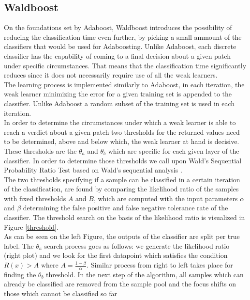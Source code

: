 \documentclass[11pt]{article}
\begin{document}
\subsection{Waldboost}
On the foundations set by Adaboost, Waldboost \cite{Matas05waldboost-} introduces the possibility of reducing the classification time even further, by picking a small ammount of the classifiers that would be used for Adaboosting. Unlike Adaboost, each discrete classifier has the capability of coming to a final decision about a given patch under specific circumstances. That means that the classification time significantly reduces since it does not necessarily require use of all the weak learners.\\
The learning process is implemented similarly to Adaboost, in each iteration, the weak learner minimizing the error for a given training set is appended to the classifier. Unlike Adaboost a random subset of the training set is used in each iteration.\\
In order to determine the circumstances under which a weak learner is able to reach a verdict about a given patch two thresholds for the returned values need to be determined, above and below which, the weak learner at hand is decisive. These thresholds are the $\theta_a$ and $\theta_b$ which are specific for each given layer of the classifier. In order to determine those thresholds we call upon Wald's Sequential Probability Ratio Test based on Wald's sequential analysis \cite{Wald:1947}.\\
The two thresholds specifying if a sample can be classified in a certain iteration of the classification, are found by comparing the likelihood ratio of the samples with fixed thresholds $A$ and $B$, which are computed with the input parameters $\alpha$ and $\beta$ determining the false positive and false negative tolerance rate of the classifier. The threshold search on the basis of the likelihood ratio is visualized in Figure \ref{threshold}.\\
As can be seen on the left Figure, the outputs of the classifier are split per true label. The $\theta_a$ search process goes as follows: we generate the likelihood ratio (right plot) and we look for the first datapoint which satisfies the condition $R(x) > A$ where $A = \frac{1-\beta}{\alpha}$. Similar process from right to left takes place for finding the $\theta_b$ threshold. In the next step of the algorithm, all samples which can already be classified are removed from the sample pool and the focus shifts on those which cannot be classified so far
\end{document}
